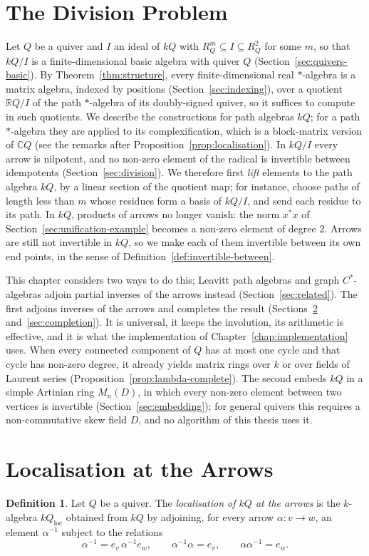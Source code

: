 \documentclass[12pt, a4paper]{report}
\theoremstyle{plain}
\theoremstyle{definition}
\newtheorem{definition}[theorem]{Definition}
\theoremstyle{remark}
\theoremstyle{plain}
\newcommand{\RR}{\mathbb{R}}
\newcommand{\CC}{\mathbb{C}}
\begin{document}
\section{The Division Problem}
\label{sec:division-problem}
Let $Q$ be a quiver and $I$ an ideal of $kQ$ with $R_Q^m\subseteq I\subseteq R_Q^2$ for some $m$, so that $kQ/I$ is a finite-dimensional basic algebra with quiver $Q$ (Section~\ref{sec:quivers-basic}). By Theorem~\ref{thm:structure}, every finite-dimensional real $*$-algebra is a matrix algebra, indexed by positions (Section~\ref{sec:indexing}), over a quotient $\RR Q/I$ of the path $*$-algebra of its doubly-signed quiver, so it suffices to compute in such quotients. We describe the constructions for path algebras $kQ$; for a path $*$-algebra they are applied to its complexification, which is a block-matrix version of $\CC Q$ (see the remarks after Proposition~\ref{prop:localisation}). In $kQ/I$ every arrow is nilpotent, and no non-zero element of the radical is invertible between idempotents (Section~\ref{sec:division}). We therefore first \emph{lift} elements to the path algebra $kQ$, by a linear section of the quotient map; for instance, choose paths of length less than $m$ whose residues form a basis of $kQ/I$, and send each residue to its path. In $kQ$, products of arrows no longer vanish: the norm $x^*x$ of Section~\ref{sec:unification-example} becomes a non-zero element of degree $2$. Arrows are still not invertible in $kQ$, so we make each of them invertible between its own end points, in the sense of Definition~\ref{def:invertible-between}.

This chapter considers two ways to do this; Leavitt path algebras and graph $C^*$-algebras adjoin partial inverses of the arrows instead (Section~\ref{sec:related}). The first adjoins inverses of the arrows and completes the result (Sections~\ref{sec:localisation} and~\ref{sec:completion}). It is universal, it keeps the involution, its arithmetic is effective, and it is what the implementation of Chapter~\ref{chap:implementation} uses. When every connected component of $Q$ has at most one cycle and that cycle has non-zero degree, it already yields matrix rings over $k$ or over fields of Laurent series (Proposition~\ref{prop:lambda-complete}). The second embeds $kQ$ in a simple Artinian ring $M_n(D)$, in which every non-zero element between two vertices is invertible (Section~\ref{sec:embedding}); for general quivers this requires a non-commutative skew field $D$, and no algorithm of this thesis uses it.

\section{Localisation at the Arrows}
\label{sec:localisation}
\begin{definition}\label{def:localisation}
Let $Q$ be a quiver. The \emph{localisation of $kQ$ at the arrows} is the $k$-algebra $kQ_{\mathrm{loc}}$ obtained from $kQ$ by adjoining, for every arrow $\alpha:v\to w$, an element $\alpha^{-1}$ subject to the relations
\[ \alpha^{-1}=e_v\,\alpha^{-1}e_w,\qquad \alpha^{-1}\alpha=e_v,\qquad \alpha\alpha^{-1}=e_w . \]
\end{definition}
\end{document}
